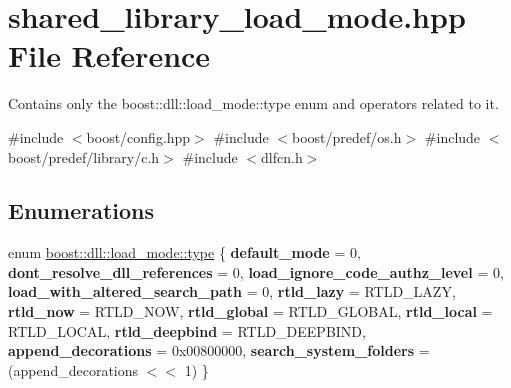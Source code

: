 \hypertarget{a00272}{}\section{shared\+\_\+library\+\_\+load\+\_\+mode.\+hpp File Reference}
\label{a00272}


Contains only the boost\+::dll\+::load\+\_\+mode\+::type enum and operators related to it.  


{\ttfamily \#include $<$boost/config.\+hpp$>$}\newline
{\ttfamily \#include $<$boost/predef/os.\+h$>$}\newline
{\ttfamily \#include $<$boost/predef/library/c.\+h$>$}\newline
{\ttfamily \#include $<$dlfcn.\+h$>$}\newline
\subsection*{Enumerations}
\begin{DoxyCompactItemize}
\item 
enum \hyperlink{a00272_a1918a602801479bc0bade54ff5665129}{boost\+::dll\+::load\+\_\+mode\+::type} \{ \newline
{\bfseries default\+\_\+mode} = 0, 
{\bfseries dont\+\_\+resolve\+\_\+dll\+\_\+references} = 0, 
{\bfseries load\+\_\+ignore\+\_\+code\+\_\+authz\+\_\+level} = 0, 
{\bfseries load\+\_\+with\+\_\+altered\+\_\+search\+\_\+path} = 0, 
\newline
{\bfseries rtld\+\_\+lazy} = R\+T\+L\+D\+\_\+\+L\+A\+ZY, 
{\bfseries rtld\+\_\+now} = R\+T\+L\+D\+\_\+\+N\+OW, 
{\bfseries rtld\+\_\+global} = R\+T\+L\+D\+\_\+\+G\+L\+O\+B\+AL, 
{\bfseries rtld\+\_\+local} = R\+T\+L\+D\+\_\+\+L\+O\+C\+AL, 
\newline
{\bfseries rtld\+\_\+deepbind} = R\+T\+L\+D\+\_\+\+D\+E\+E\+P\+B\+I\+ND, 
{\bfseries append\+\_\+decorations} = 0x00800000, 
{\bfseries search\+\_\+system\+\_\+folders} = (append\+\_\+decorations $<$$<$ 1)
 \}
\end{DoxyCompactItemize}
